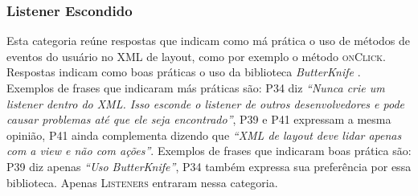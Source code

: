 \subsubsection{Listener Escondido}
Esta categoria re\'une respostas que indicam como m\'a pr\'atica o uso de métodos de eventos do usuário no XML de layout, como por exemplo o método \textsc{onClick}. Respostas indicam como boas pr\'aticas o uso da biblioteca \textit{ButterKnife} \cite{ButterKnife}. Exemplos de frases que indicaram m\'as pr\'aticas s\~ao: P34 diz \textit{``Nunca crie um listener dentro do XML. Isso esconde o listener de outros desenvolvedores e pode causar problemas até que ele seja encontrado''}, P39 e P41 expressam a mesma opinião, P41 ainda complementa dizendo que \textit{``XML de layout deve lidar apenas com a view e não com ações''}. Exemplos de frases que indicaram boas pr\'atica s\~ao: P39 diz apenas \textit{``Uso ButterKnife''}, P34 também expressa sua preferência por essa biblioteca. Apenas \textsc{Listeners} entraram nessa categoria.










